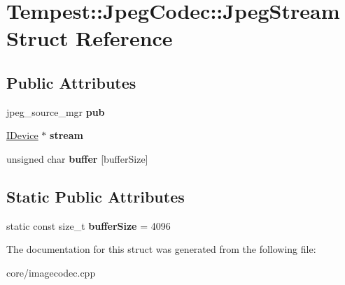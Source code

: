 \hypertarget{struct_tempest_1_1_jpeg_codec_1_1_jpeg_stream}{\section{Tempest\+:\+:Jpeg\+Codec\+:\+:Jpeg\+Stream Struct Reference}
\label{struct_tempest_1_1_jpeg_codec_1_1_jpeg_stream}
}
\subsection*{Public Attributes}
\begin{DoxyCompactItemize}
\item 
\hypertarget{struct_tempest_1_1_jpeg_codec_1_1_jpeg_stream_ab62c802c7468baf27d63abe5d14738f6}{jpeg\+\_\+source\+\_\+mgr {\bfseries pub}}\label{struct_tempest_1_1_jpeg_codec_1_1_jpeg_stream_ab62c802c7468baf27d63abe5d14738f6}

\item 
\hypertarget{struct_tempest_1_1_jpeg_codec_1_1_jpeg_stream_acdc0dacdc3f928f07bf1a3f1865a1df5}{\hyperlink{class_tempest_1_1_i_device}{I\+Device} $\ast$ {\bfseries stream}}\label{struct_tempest_1_1_jpeg_codec_1_1_jpeg_stream_acdc0dacdc3f928f07bf1a3f1865a1df5}

\item 
\hypertarget{struct_tempest_1_1_jpeg_codec_1_1_jpeg_stream_a10c4f325d983b0d3b180119e6a8d0341}{unsigned char {\bfseries buffer} \mbox{[}buffer\+Size\mbox{]}}\label{struct_tempest_1_1_jpeg_codec_1_1_jpeg_stream_a10c4f325d983b0d3b180119e6a8d0341}

\end{DoxyCompactItemize}
\subsection*{Static Public Attributes}
\begin{DoxyCompactItemize}
\item 
\hypertarget{struct_tempest_1_1_jpeg_codec_1_1_jpeg_stream_a7ee395575c44f304ca584c421823ccc9}{static const size\+\_\+t {\bfseries buffer\+Size} = 4096}\label{struct_tempest_1_1_jpeg_codec_1_1_jpeg_stream_a7ee395575c44f304ca584c421823ccc9}

\end{DoxyCompactItemize}


The documentation for this struct was generated from the following file\+:\begin{DoxyCompactItemize}
\item 
core/imagecodec.\+cpp\end{DoxyCompactItemize}

